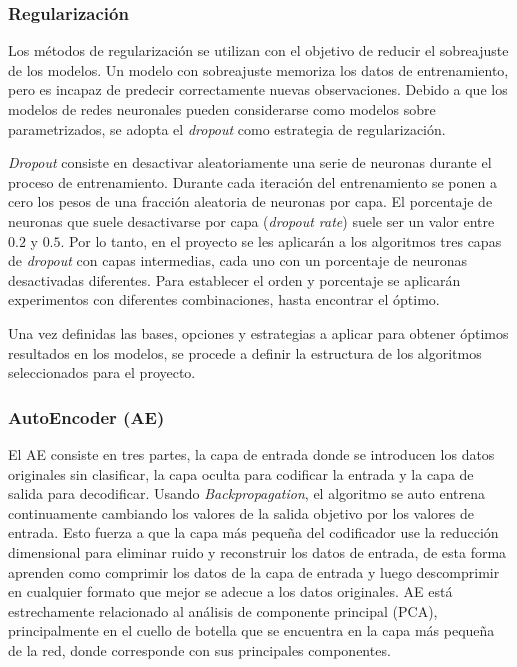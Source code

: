     \subsubsection{Regularizaci\'{o}n}
    
    Los m\'{e}todos de regularizaci\'{o}n se utilizan con el objetivo de reducir el sobreajuste de los modelos. Un modelo con sobreajuste memoriza los datos de entrenamiento, pero es incapaz de predecir correctamente nuevas observaciones. Debido a que los modelos de redes neuronales pueden considerarse como modelos sobre parametrizados, se adopta el \textit{dropout} como estrategia de regularizaci\'{o}n.
    
    \textit{Dropout} consiste en desactivar aleatoriamente una serie de neuronas durante el proceso de entrenamiento. Durante cada iteraci\'{o}n del entrenamiento se ponen a cero los pesos de una fracci\'{o}n aleatoria de neuronas por capa. El porcentaje de neuronas que suele desactivarse por capa (\textit{dropout rate}) suele ser un valor entre $0.2$ y $0.5$. Por lo tanto, en el proyecto se les aplicar\'{a}n a los algoritmos tres capas de \textit{dropout} con capas intermedias, cada uno con un porcentaje de neuronas desactivadas diferentes. Para establecer el orden y porcentaje se aplicar\'{a}n experimentos con diferentes combinaciones, hasta encontrar el \'{o}ptimo.
       
    Una vez definidas las bases, opciones y estrategias a aplicar para obtener \'{o}ptimos resultados en los modelos, se procede a definir la estructura de los algoritmos seleccionados para el proyecto.
    
    \subsubsection{AutoEncoder (AE)}
    
    El AE consiste en tres partes, la capa de entrada donde se introducen los datos originales sin clasificar, la capa oculta para codificar la entrada y la capa de salida para decodificar. Usando \textit{Backpropagation}, el algoritmo se auto entrena continuamente cambiando los valores de la salida objetivo por los valores de entrada. Esto fuerza a que la capa m\'{a}s peque\~{n}a del codificador use la reducci\'{o}n dimensional para eliminar ruido y reconstruir los datos de entrada, de esta forma aprenden como comprimir los datos de la capa de entrada y luego descomprimir en cualquier formato que mejor se adecue a los datos originales. AE est\'{a} estrechamente relacionado al an\'{a}lisis de componente principal (PCA), principalmente en el cuello de botella que se encuentra en la capa m\'{a}s peque\~{n}a de la red, donde corresponde con sus principales componentes.
    
